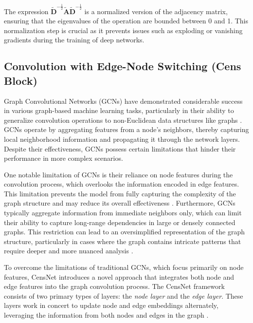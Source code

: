The expression \( \tilde{\mathbf{D}}^{-\frac{1}{2}} \tilde{\mathbf{A}} \tilde{\mathbf{D}}^{-\frac{1}{2}} \) is a normalized version of the adjacency matrix, ensuring that the eigenvalues of the operation are bounded between 0 and 1. This normalization step is crucial as it prevents issues such as exploding or vanishing gradients during the training of deep networks.

\subsection{Convolution with Edge-Node Switching (Cens Block)}

Graph Convolutional Networks (GCNs) have demonstrated considerable success in various graph-based machine learning tasks, particularly in their ability to generalize convolution operations to non-Euclidean data structures like graphs \cite{Fu_Wang_Liu_Liu_Zhou_You_Peng_Jing_2022} . GCNs operate by aggregating features from a node's neighbors, thereby capturing local neighborhood information and propagating it through the network layers. Despite their effectiveness, GCNs possess certain limitations that hinder their performance in more complex scenarios.




One notable limitation of GCNs is their reliance on node features during the convolution process, which overlooks the information encoded in edge features. This limitation prevents the model from fully capturing the complexity of the graph structure and may reduce its overall effectiveness \cite{8954414}. Furthermore, GCNs typically aggregate information from immediate neighbors only, which can limit their ability to capture long-range dependencies in large or densely connected graphs. This restriction can lead to an oversimplified representation of the graph structure, particularly in cases where the graph contains intricate patterns that require deeper and more nuanced analysis \cite{Guo_Zhang_Teng_Lu_2019}.

To overcome the limitations of traditional GCNs, which focus primarily on node features, CensNet introduces a novel approach that integrates both node and edge features into the graph convolution process. The CensNet framework consists of two primary types of layers: the \textit{node layer} and the \textit{edge layer}. These layers work in concert to update node and edge embeddings alternately, leveraging the information from both nodes and edges in the graph \cite{9224195}.

